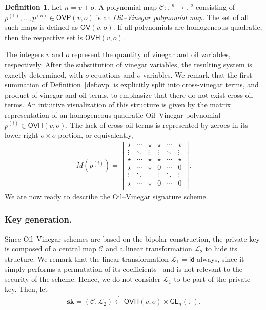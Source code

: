 \documentclass[draft, 12pt, a4paper, oneside]{memoir}
\newcommand{\random}{\overset{\mathsf{r}}{\gets}}
\theoremstyle{definition}
\newtheorem{definition}[theorem]{Definition}
\begin{document}
\begin{definition}
  Let $n = v + o$. A polynomial map $\mathcal{C} : \mathbb{F}^{n} \to \mathbb{F}^{o}$ consisting of $p^{(1)}, \dots, p^{(o)} \in \mathsf{OVP}(v, o)$ is an \emph{Oil--Vinegar polynomial map}. The set of all such maps is defined as $\mathsf{OV}(v, o)$. If all polynomials are homogeneous quadratic, then the respective set is $\mathsf{OVH}(v, o)$.
\end{definition}

The integers $v$ and $o$ represent the quantity of vinegar and oil variables, respectively. After the substitution of vinegar variables, the resulting system is exactly determined, with $o$ equations and $o$ variables. We remark that the first summation of Definition~\ref{def:ovp} is explicitly split into cross-vinegar terms, and product of vinegar and oil terms, to emphasize that there do not exist cross-oil terms. An intuitive visualization of this structure is given by the matrix representation of an homogeneous quadratic Oil--Vinegar polynomial $p^{(i)} \in \mathsf{OVH}(v, o)$. The lack of cross-oil terms is represented by zeroes in its lower-right $o \times o$ portion, or equivalently,
\begin{align*}
  \widetilde{M}(p^{(i)}) = \begin{bmatrix}
    \star  & \cdots & \star  & \star  & \cdots & \star  \\
    \vdots & \ddots & \vdots & \vdots & \ddots & \vdots \\
    \star  & \cdots & \star  & \star  & \cdots & \star  \\
    \star  & \cdots & \star  & 0      & \cdots & 0      \\
    \vdots & \ddots & \vdots & \vdots & \ddots & \vdots \\
    \star  & \cdots & \star  & 0      & \cdots & 0      \\
  \end{bmatrix}.
\end{align*}
We are now ready to describe the Oil--Vinegar signature scheme.

\subsubsection{Key generation.}

Since Oil--Vinegar schemes are based on the bipolar construction, the private key is composed of a central map $\mathcal{C}$ and a linear transformation $\mathcal{L}_{2}$ to hide its structure. We remark that the linear transformation $\mathcal{L}_{1} = \mathsf{id}$ always, since it simply performs a permutation of its coefficients~\cite[p. 71]{Thomae:201306} and is not relevant to the security of the scheme. Hence, we do not consider $\mathcal{L}_{1}$ to be part of the private key. Then, let
\begin{align}
  \mathbf{sk} = (\mathcal{C}, \mathcal{L}_{2})
    \random \mathsf{OVH}(v, o) \times \mathsf{GL}_{n}(\mathbb{F}).
\end{align}
\end{document}

